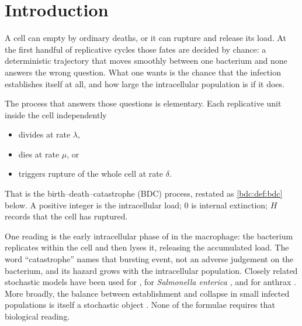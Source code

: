 \section{Introduction}
\label{bdc:sec:intro}

A cell can empty by ordinary deaths, or it can rupture and release its load.
At the first handful of replicative cycles those fates are decided by chance:
a deterministic trajectory that moves smoothly between one bacterium and none
answers the wrong question. What one wants is the chance that the infection
establishes itself at all, and how large the intracellular population is if it
does.

The process that answers those questions is elementary. Each replicative unit
inside the cell independently
\begin{itemize}[leftmargin=1.8em,itemsep=0.15em,topsep=0.25em]
\item divides at rate $\lambda$,
\item dies at rate $\mu$, or
\item triggers rupture of the whole cell at rate $\delta$.
\end{itemize}
That is the birth--death--catastrophe (BDC) process, restated as
\cref{bdc:def:bdc} below. A positive integer is the intracellular load; $0$ is
internal extinction; $H$ records that the cell has ruptured.

One reading is the early intracellular phase of \yp{} in the macrophage: the
bacterium replicates within the cell and then lyses it, releasing the
accumulated load. The word ``catastrophe'' names that bursting event, not an
adverse judgement on the bacterium, and its hazard grows with the
intracellular population. Closely related stochastic models have been used for
\ft{} \cite{carruthers2020stochastic,oyston2004tularaemia}, for
\textit{Salmonella enterica} \cite{brown2006intracellular}, and for anthrax
\cite{williams2021anthrax}. More broadly, the balance between establishment
and collapse in small infected populations is itself a stochastic object
\cite{hataye2019principles,williams2024reproduction}. None of the formulae
requires that biological reading.

